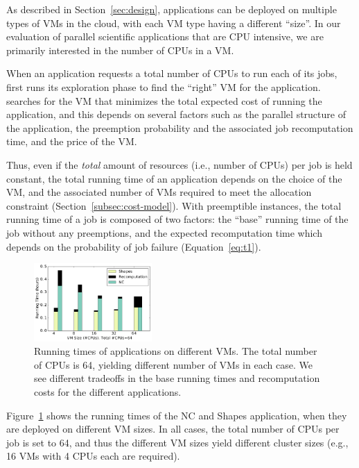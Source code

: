 As described in Section~\ref{sec:design}, applications can be deployed on multiple types of VMs in the cloud, with each VM type having a different ``size''.
In our evaluation of parallel scientific applications that are CPU intensive, we are primarily interested in the number of CPUs in a VM.

When an application requests a total number of CPUs to run each of its jobs, \sysname first runs its exploration phase to find the ``right'' VM for the application.
\sysname searches for the VM that minimizes the total expected cost of running the application, and this depends on  several factors such as the parallel structure of the application, the preemption probability and the associated job recomputation time, and the price of the VM.


Thus, even if the \emph{total} amount of resources (i.e., number of CPUs) per job is held constant, the total running time of an application depends on the choice of the VM, and the associated number of VMs required to meet the allocation constraint (Section~\ref{subsec:cost-model}).
%
With preemptible instances, the total running time of a job is composed of two factors: the ``base'' running time of the job without any preemptions, and the expected recomputation time which depends on the probability of job failure (Equation~\ref{eq:t1}). 

\begin{figure}
  \centering
  \includegraphics[width=0.4\textwidth]{../graphs/runtime-bars.pdf}
  \caption{Running times of applications on different VMs. The total number of CPUs is 64, yielding different number of VMs in each case. We see different tradeoffs in the base running times and recomputation costs for the different applications.}
  \label{fig:runtimes-bar}
\end{figure}


Figure~\ref{fig:runtimes-bar} shows the running times of the NC and Shapes application, when they are deployed on different VM sizes.
In all cases, the total number of CPUs per job is set to 64, and thus the different VM sizes yield different cluster sizes (e.g., 16 VMs with 4 CPUs each are required).


